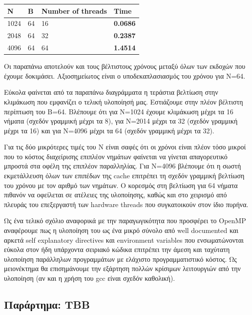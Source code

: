 \documentclass[12pt,titlepage]{article}
\begin{document}
\begin{center}
    \begin{tabular}{@{}llll@{}}
        \toprule
        N    & B  & Number of threads & Time            \\
        \midrule
        1024 & 64 & 16                & \textbf{0.0686} \\
        2048 & 64 & 32                & \textbf{0.2387} \\
        4096 & 64 & 64                & \textbf{1.4514} \\
        \bottomrule
    \end{tabular}
\end{center}

Οι παραπάνω αποτελούν και τους βέλτιστους χρόνους μεταξύ όλων των εκδοχών που
έχουμε δοκιμάσει. Αξιοσημείωτος είναι ο υποδεκαπλασιασμός του χρόνου για N=64.

Εύκολα φαίνεται από τα παραπάνω διαγράμματα η τεράστια βελτίωση στην κλιμάκωση
που εμφανίζει ο τελική υλοποίησή μας. Εστιάζουμε στην πλέον βέλτιστη περίπτωση
του B=64. Βλέπουμε ότι για N=1024 έχουμε κλιμάκωση μέχρι τα 16 νήματα (σχεδόν
γραμμική μέχρι τα 8), για N=2014 μέχρι τα 32 (σχεδόν γραμμική μέχρι τα 16) και
για N=4096 μέχρι τα 64 (σχεδόν γραμμική μέχρι τα 32).

Για τις δύο μικρότερες τιμές του N είναι σαφές ότι οι χρόνοι είναι πλέον τόσο
μικροί που το κόστος διαχείρισης επιπλέον νημάτων φαίνεται να γίνεται
απαγορευτικό μπροστά στα οφέλη της επιπλέον παραλληλίας. Για Ν=4096 βλέπουμε ότι
η σωστή εκμετάλλευση όλων των επιπέδων της cache επιτρέπει τη σχεδόν γραμμική
βελτίωση του χρόνου με τον αριθμό των νημάτων. Ο κορεσμός στη βελτίωση για 64
νήματα πιθανόν να οφείλεται σε ατέλειες της υλοποίησης, καθώς και στο χειρισμό
από πλευράς του επεξεργαστή των hardware threads που συγκατοικούν στον ίδιο
πυρήνα.

Ως ένα τελικό σχόλιο αναφορικά με την παραγωγικότητα που προσφέρει το OpenMP
αναφέρουμε πως η υλοποίηση του ως ένα μικρό σύνολο από well documented και
αρκετά self explanatory directives και environment variables που ενσωματώνονται
εύκολα στον ήδη υπάρχοντα σειριακό κώδικα επιτρέπει την άμεση και ταχύτατη
υλοποίηση παράλληλων προγραμμάτων με ελάχιστο προγραμματιστικό κόστος. Ως
μειονέκτημα θα επισημάνουμε την εξάρτηση πολλών κρίσιμων λειτουργιών από την
υλοποίηση (αν και η χρήση του gcc είναι σχεδόν καθολική).

\newpage

\subsection*{Παράρτημα: TBB}
\end{document}
